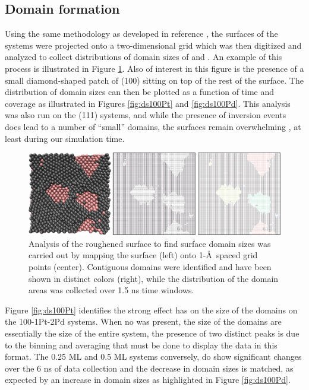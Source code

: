 \subsection{Domain formation}
Using the same methodology as developed in reference \citep{Michalka:2015aa},
the surfaces of the systems were projected onto a two-dimensional grid which
was then digitized and analyzed to collect distributions of domain sizes of
 and . An example of this process is illustrated in Figure
\ref{fig:surfaceGrid}. Also of interest in this figure is the presence of a
small diamond-shaped patch of (100)  sitting on top of the rest of the
 surface. The distribution of domain sizes can then be plotted as a
function of time and  coverage as illustrated in Figures
\ref{fig:ds100Pt} and \ref{fig:ds100Pd}. This analysis was also run on the
(111) systems, and while the presence of inversion events does lead to a number
of ``small''  domains, the surfaces remain overwhelming , at
least during our simulation time.

\begin{landscape}
\begin{figure}[p!]
\centering
  \includegraphics[width=\linewidth]{../figures/appC/grid_small.pdf}
  \caption{Analysis of the roughened surface to find surface domain sizes was
carried out by mapping the surface (left) onto 1-\AA\ spaced grid
points (center). Contiguous domains were identified and have been shown in
distinct colors (right), while the distribution of the domain areas was collected
over 1.5 ns time windows.}
\label{fig:surfaceGrid}
\end{figure}
\end{landscape}

Figure \ref{fig:ds100Pt} identifies the strong effect  has on the size
of the  domains on the 100-1Pt-2Pd systems. When no  was present,
the size of the domains are essentially the size of the entire system, the
presence of two distinct peaks is due to the binning and averaging that must be
done to display the data in this format. The 0.25 ML and 0.5 ML systems
conversely, do show significant changes over the 6 ns of data collection and
the decrease in  domain sizes is matched, as expected by an increase in
 domain sizes as highlighted in Figure \ref{fig:ds100Pd}. 

